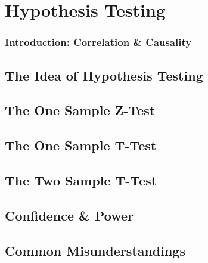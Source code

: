 \pagestyle{headings}
\chapter{Hypothesis Testing} \label{chp 5}
\thispagestyle{fancy}

\subsection*{Introduction: Correlation & Causality}

\section{The Idea of Hypothesis Testing}

\section{The One Sample Z-Test}

\section{The One Sample T-Test}

\section{The Two Sample T-Test}

\section{Confidence \& Power}

\section{Common Misunderstandings}


